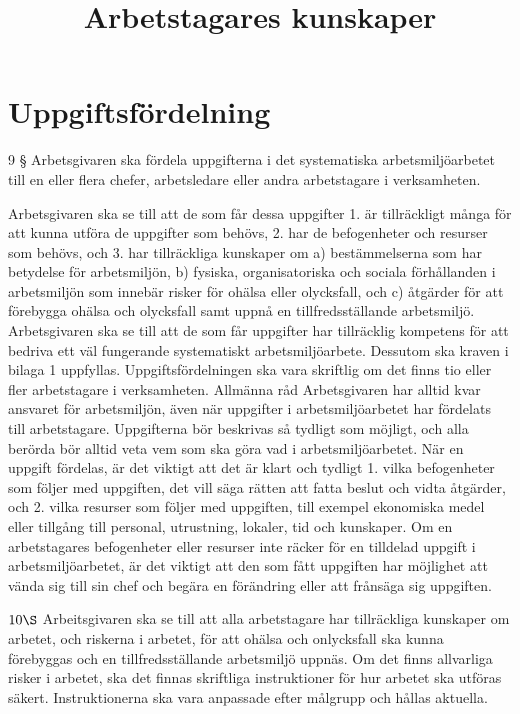 \section*{Uppgiftsfördelning}
9 § Arbetsgivaren ska fördela uppgifterna i det systematiska arbetsmiljöarbetet till en eller flera chefer, arbetsledare eller andra arbetstagare i verksamheten.

Arbetsgivaren ska se till att de som får dessa uppgifter
1. är tillräckligt många för att kunna utföra de uppgifter som behövs,
2. har de befogenheter och resurser som behövs, och
3. har tillräckliga kunskaper om
a) bestämmelserna som har betydelse för arbetsmiljön,
b) fysiska, organisatoriska och sociala förhållanden i arbetsmiljön som innebär risker för ohälsa eller olycksfall, och
c) åtgärder för att förebygga ohälsa och olycksfall samt uppnå en tillfredsställande arbetsmiljö.
Arbetsgivaren ska se till att de som får uppgifter har tillräcklig kompetens för att bedriva ett väl fungerande systematiskt arbetsmiljöarbete.
Dessutom ska kraven i bilaga 1 uppfyllas.
Uppgiftsfördelningen ska vara skriftlig om det finns tio eller fler arbetstagare i verksamheten.
Allmänna råd
Arbetsgivaren har alltid kvar ansvaret för arbetsmiljön, även när uppgifter i arbetsmiljöarbetet har fördelats till arbetstagare.
Uppgifterna bör beskrivas så tydligt som möjligt, och alla berörda bör alltid veta vem som ska göra vad i arbetsmiljöarbetet.
När en uppgift fördelas, är det viktigt att det är klart och tydligt
1. vilka befogenheter som följer med uppgiften, det vill säga rätten att fatta beslut och vidta åtgärder, och
2. vilka resurser som följer med uppgiften, till exempel ekonomiska medel eller tillgång till personal, utrustning, lokaler, tid och kunskaper.
Om en arbetstagares befogenheter eller resurser inte räcker för en tilldelad uppgift i arbetsmiljöarbetet, är det viktigt att den som fått uppgiften har möjlighet att vända sig till sin chef och begära en förändring eller att frånsäga sig uppgiften.

\title{
Arbetstagares kunskaper
}
\(10 \S\) Arbeitsgivaren ska se till att alla arbetstagare har tillräckliga kunskaper om arbetet, och riskerna i arbetet, för att ohälsa och onlycksfall ska kunna förebyggas och en tillfredsställande arbetsmiljö uppnäs.
Om det finns allvarliga risker i arbetet, ska det finnas skriftliga instruktioner för hur arbetet ska utföras säkert. Instruktionerna ska vara anpassade efter målgrupp och hållas aktuella.
